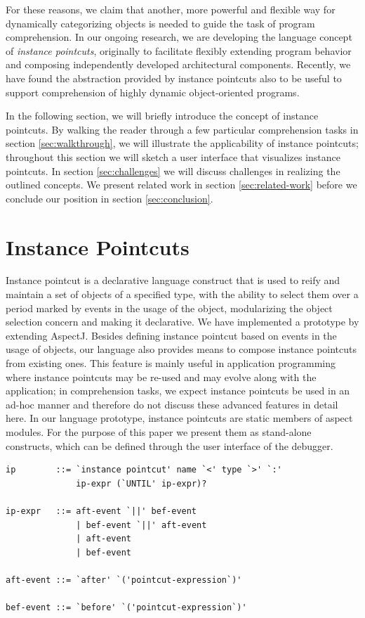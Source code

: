 \documentclass{sig-alternate}
\begin{document}
For these reasons, we claim that another, more powerful and flexible way for dynamically categorizing objects is needed to guide the task of program comprehension.
In our ongoing research, we are developing the language concept of \emph{instance pointcuts}, originally to facilitate flexibly extending program behavior and composing independently developed architectural components.
Recently, we have found the abstraction provided by instance pointcuts also to be useful to support comprehension of highly dynamic object-oriented programs.

In the following section, we will briefly introduce the concept of instance pointcuts.
By walking the reader through a few particular comprehension tasks in section \ref{sec:walkthrough}, we will illustrate the applicability of instance pointcuts;
throughout this section we will sketch a user interface that visualizes instance pointcuts.
In section \ref{sec:challenges} we will discuss challenges in realizing the outlined concepts.
We present related work in section \ref{sec:related-work} before we conclude our position in section \ref{sec:conclusion}.

\section{Instance Pointcuts}
\label{sec:instance-pointcuts}

Instance pointcut is a declarative language construct that is used to reify and maintain a set of objects of a specified type, with the ability to select them over a period marked by events in the usage of the object, modularizing the object selection concern and making it declarative.
We have implemented a prototype by extending AspectJ.
Besides defining instance pointcut based on events in the usage of objects, our language also provides means to compose instance pointcuts from existing ones.
This feature is mainly useful in application programming where instance pointcuts may be re-used and may evolve along with the application; in comprehension tasks, we expect instance pointcuts be used in an ad-hoc manner and therefore do not discuss these advanced features in detail here.
In our language prototype, instance pointcuts are static members of aspect modules. For the purpose of this paper we present them as stand-alone constructs, which can be defined through the user interface of the debugger.

\begin{lstlisting}[caption={Grammar definition for instance pointcuts},label=fig:grammar1, columns=spaceflexible]
ip        ::= `instance pointcut' name `<' type `>' `:'
              ip-expr (`UNTIL' ip-expr)?

ip-expr   ::= aft-event `||' bef-event
              | bef-event `||' aft-event
              | aft-event
              | bef-event

aft-event ::= `after' `('pointcut-expression`)'

bef-event ::= `before' `('pointcut-expression`)'
\end{lstlisting}
\end{document}
